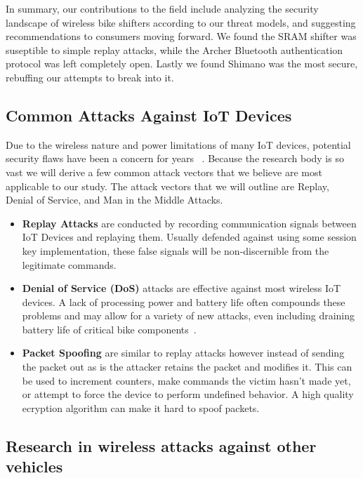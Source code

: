 \documentclass[letterpaper,twocolumn,10pt]{article}
\begin{document}
In summary, our contributions to the field include analyzing the security landscape of wireless bike shifters according to our threat models, and suggesting recommendations to consumers moving forward. We found the SRAM shifter was suseptible to simple replay attacks, while the Archer Bluetooth authentication protocol was left completely open. Lastly we found Shimano was the most secure, rebuffing our attempts to break into it.

\subsection{Common Attacks Against IoT Devices}

Due to the wireless nature and power limitations of many IoT devices, potential security flaws have been a concern for years~ \cite{HeXu}. Because the research body is so vast we will derive a few common attack vectors that we believe are most applicable to our study. The attack vectors that we will outline are Replay, Denial of Service, and Man in the Middle Attacks.

\begin{itemize}
  \item \textbf{Replay Attacks} are conducted by recording communication signals between IoT Devices and replaying them. Usually defended against using some session key implementation, these false signals will be non-discernible from the legitimate commands.
  \item \textbf{Denial of Service (DoS)} attacks are effective against most wireless IoT devices. A lack of processing power and battery life often compounds these problems and may allow for a variety of new attacks, even including draining battery life of critical bike components~\cite{Moyers}.
  \item \textbf{Packet Spoofing} are similar to replay attacks however instead of sending the packet out as is the attacker retains the packet and modifies it. This can be used to increment counters, make commands the victim hasn't made yet, or attempt to force the device to perform undefined behavior. A high quality ecryption algorithm can make it hard to spoof packets.
\end{itemize}

\subsection{Research in wireless attacks against other vehicles}
\end{document}
